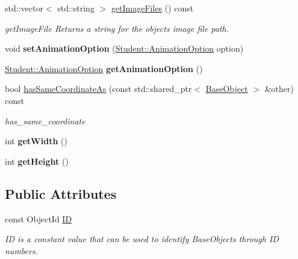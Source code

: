 \begin{DoxyCompactItemize}
\item 
std\-::vector$<$ std\-::string $>$ \hyperlink{class_course_1_1_base_object_a2da7afb60d792da5d3c5659c8c292e28}{get\-Image\-Files} () const 
\begin{DoxyCompactList}\small\item\em get\-Image\-File Returns a string for the objects image file path. \end{DoxyCompactList}\item 
\hypertarget{class_course_1_1_base_object_a647f38ea83ccd8d421a2d7d3295d3a9e}{void {\bfseries set\-Animation\-Option} (\hyperlink{class_student_1_1_animation_option}{Student\-::\-Animation\-Option} option)}\label{class_course_1_1_base_object_a647f38ea83ccd8d421a2d7d3295d3a9e}

\item 
\hypertarget{class_course_1_1_base_object_ab7a172a791116c157a5c9ce012a3ddf6}{\hyperlink{class_student_1_1_animation_option}{Student\-::\-Animation\-Option} {\bfseries get\-Animation\-Option} ()}\label{class_course_1_1_base_object_ab7a172a791116c157a5c9ce012a3ddf6}

\item 
bool \hyperlink{class_course_1_1_base_object_a668c1a428563792cfe6418b85bf91ce0}{has\-Same\-Coordinate\-As} (const std\-::shared\-\_\-ptr$<$ \hyperlink{class_course_1_1_base_object}{Base\-Object} $>$ \&other) const 
\begin{DoxyCompactList}\small\item\em has\-\_\-same\-\_\-coordinate \end{DoxyCompactList}\item 
\hypertarget{class_course_1_1_base_object_a7831558233bffdec7a23766c31671382}{int {\bfseries get\-Width} ()}\label{class_course_1_1_base_object_a7831558233bffdec7a23766c31671382}

\item 
\hypertarget{class_course_1_1_base_object_aea13ff4426c2b9d63cfc32e923961517}{int {\bfseries get\-Height} ()}\label{class_course_1_1_base_object_aea13ff4426c2b9d63cfc32e923961517}

\end{DoxyCompactItemize}
\subsection*{Public Attributes}
\begin{DoxyCompactItemize}
\item 
\hypertarget{class_course_1_1_base_object_a1997666c7ed1d0cc9fc0fdcec725ca5e}{const Object\-Id \hyperlink{class_course_1_1_base_object_a1997666c7ed1d0cc9fc0fdcec725ca5e}{I\-D}}\label{class_course_1_1_base_object_a1997666c7ed1d0cc9fc0fdcec725ca5e}

\begin{DoxyCompactList}\small\item\em I\-D is a constant value that can be used to identify Base\-Objects through I\-D numbers. \end{DoxyCompactList}\end{DoxyCompactItemize}
